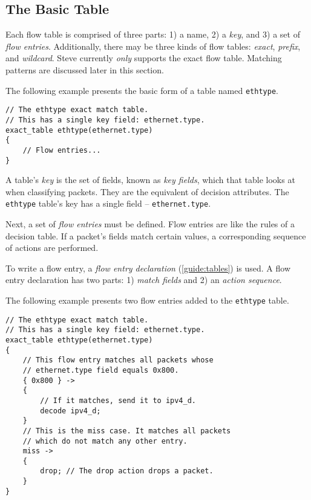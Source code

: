 \subsection{The Basic Table} \label{tut:basic_table}

Each flow table is comprised of three parts: 1) a name, 2) a \textit{key}, and
3) a set of \textit{flow entries}. Additionally, there may be three kinds of
flow tables: \textit{exact}, \textit{prefix}, and \textit{wildcard}. Steve
currently \textit{only} supports the exact flow table. Matching patterns are discussed later in this section.

The following example presents the basic form of a table named
\texttt{ethtype}. 

\begin{codepage}
\begin{lstlisting}
// The ethtype exact match table.
// This has a single key field: ethernet.type.
exact_table ethtype(ethernet.type)
{
	// Flow entries...
}
\end{lstlisting}
\end{codepage}

A table's \textit{key} is the set of fields, known as
\textit{key fields}, which that table looks at when classifying packets. They are the
equivalent of decision attributes. The \texttt{ethtype} table's key has a single
field -- \texttt{ethernet.type}.

Next, a set of \textit{flow entries} must be defined. Flow entries are like the
rules of a decision table. If a packet's fields match certain values, a
corresponding sequence of actions are performed.

To write a flow entry, a \textit{flow entry declaration}
(\ref{guide:tables}) is used. A flow entry declaration has two parts: 1) \textit{match
fields} and 2) an \textit{action sequence}. 

The following example presents two flow entries added to the \texttt{ethtype} table.

\begin{codepage}
\begin{lstlisting}
// The ethtype exact match table.
// This has a single key field: ethernet.type.
exact_table ethtype(ethernet.type)
{
	// This flow entry matches all packets whose
	// ethernet.type field equals 0x800.
	{ 0x800 } ->
	{
		// If it matches, send it to ipv4_d.
		decode ipv4_d;
	}
	// This is the miss case. It matches all packets
	// which do not match any other entry.
	miss ->
	{
		drop; // The drop action drops a packet.
	}
}
\end{lstlisting}
\end{codepage}

